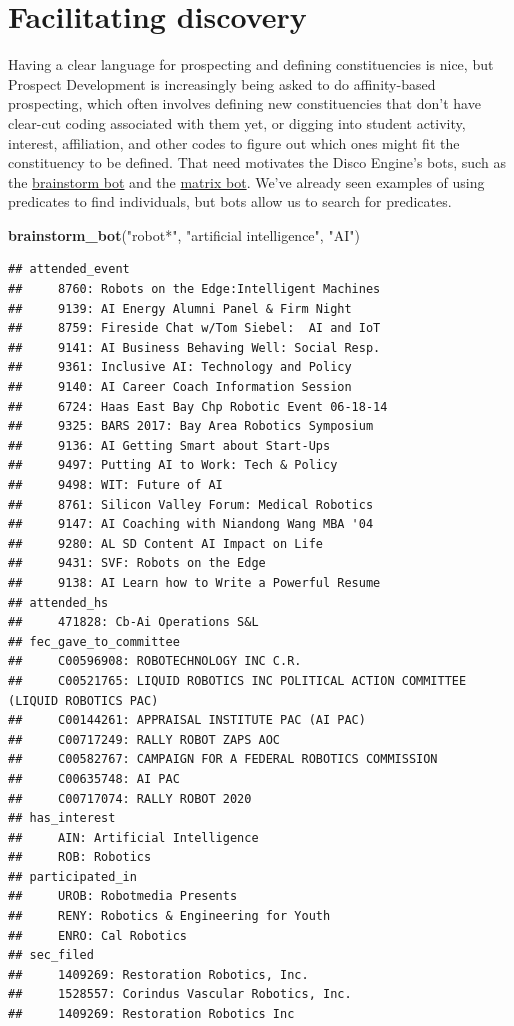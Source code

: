 \documentclass[]{book}
\newenvironment{Shaded}{\begin{snugshade}}{\end{snugshade}}
\newcommand{\KeywordTok}[1]{\textcolor[rgb]{0.13,0.29,0.53}{\textbf{#1}}}
\newcommand{\NormalTok}[1]{#1}
\newcommand{\StringTok}[1]{\textcolor[rgb]{0.31,0.60,0.02}{#1}}
\begin{document}
\hypertarget{facilitating-discovery}{%
\section{Facilitating discovery}\label{facilitating-discovery}}

Having a clear language for prospecting and defining constituencies is nice, but Prospect Development is increasingly being asked to do affinity-based prospecting, which often involves defining new constituencies that don't have clear-cut coding associated with them yet, or digging into student activity, interest, affiliation, and other codes to figure out which ones might fit the constituency to be defined. That need motivates the Disco Engine's bots, such as the \protect\hyperlink{brainstorm-bot}{brainstorm bot} and the \protect\hyperlink{matrix-bot}{matrix bot}. We've already seen examples of using predicates to find individuals, but bots allow us to search for predicates.

\begin{Shaded}
\begin{Highlighting}[]
\KeywordTok{brainstorm_bot}\NormalTok{(}\StringTok{"robot*"}\NormalTok{, }\StringTok{"artificial intelligence"}\NormalTok{, }\StringTok{"AI"}\NormalTok{)}
\end{Highlighting}
\end{Shaded}

\begin{verbatim}
## attended_event 
##     8760: Robots on the Edge:Intelligent Machines
##     9139: AI Energy Alumni Panel & Firm Night
##     8759: Fireside Chat w/Tom Siebel:  AI and IoT
##     9141: AI Business Behaving Well: Social Resp.
##     9361: Inclusive AI: Technology and Policy
##     9140: AI Career Coach Information Session
##     6724: Haas East Bay Chp Robotic Event 06-18-14
##     9325: BARS 2017: Bay Area Robotics Symposium
##     9136: AI Getting Smart about Start-Ups
##     9497: Putting AI to Work: Tech & Policy
##     9498: WIT: Future of AI
##     8761: Silicon Valley Forum: Medical Robotics
##     9147: AI Coaching with Niandong Wang MBA '04
##     9280: AL SD Content AI Impact on Life
##     9431: SVF: Robots on the Edge
##     9138: AI Learn how to Write a Powerful Resume
## attended_hs 
##     471828: Cb-Ai Operations S&L
## fec_gave_to_committee 
##     C00596908: ROBOTECHNOLOGY INC C.R.
##     C00521765: LIQUID ROBOTICS INC POLITICAL ACTION COMMITTEE (LIQUID ROBOTICS PAC)
##     C00144261: APPRAISAL INSTITUTE PAC (AI PAC)
##     C00717249: RALLY ROBOT ZAPS AOC
##     C00582767: CAMPAIGN FOR A FEDERAL ROBOTICS COMMISSION
##     C00635748: AI PAC
##     C00717074: RALLY ROBOT 2020
## has_interest 
##     AIN: Artificial Intelligence
##     ROB: Robotics
## participated_in 
##     UROB: Robotmedia Presents
##     RENY: Robotics & Engineering for Youth
##     ENRO: Cal Robotics
## sec_filed 
##     1409269: Restoration Robotics, Inc.
##     1528557: Corindus Vascular Robotics, Inc.
##     1409269: Restoration Robotics Inc
\end{verbatim}
\end{document}
